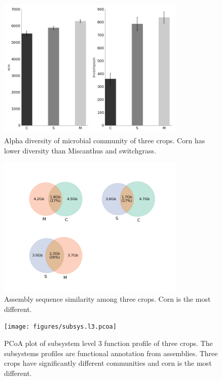 \documentclass[12pt]{article}
\begin{document}
{    \begin{figure}[tbph!]
    \centering
    \includegraphics[width=0.8\textwidth]{figures/otu.alpha.div}
    \caption[Alpha diversity]{Alpha diversity of microbial community of three crops. Corn has lower diversity than Miscanthus and switchgrass.}
    \label{fig:otu.alpha.div}
    \end{figure}



    \begin{figure}[tbph!]
    \centering
    \includegraphics[width=0.8\textwidth]{figures/contig.sim.venn}
    \caption[Assembly sequence similarity]{Assembly sequence similarity among three crops. Corn is the most different.}
    \label{fig:contig.sim.venn}
    \end{figure}


    \begin{figure}[tbph!]
    \centering
    \texttt{[image: figures/subsys.l3.pcoa]}
    \caption[PCoA plot based on subsystem profile]{PCoA plot of subsystem level 3 function profile of three crops. The subsystems profiles are functional annotation from assemblies. Three crops have significantly different communities and corn is the most different.}
    \label{fig:subsys.l3.pcoa}
    \end{figure}

}
\end{document}
